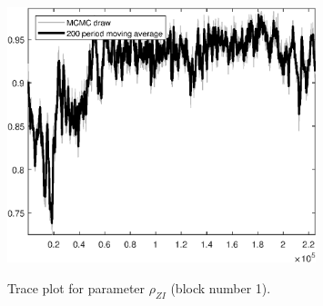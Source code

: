 \begin{figure}[H]
\centering
  \includegraphics[width=0.8\textwidth]{BRS_sectoral/graphs/TracePlot_rho_ZI_blck_1}\\
    \caption{Trace plot for parameter ${\rho_{ZI}}$ (block number 1).}
\end{figure}
